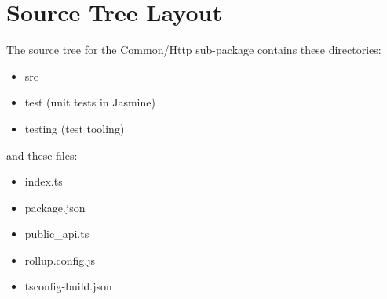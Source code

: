\section{Source Tree Layout}

The source tree for the Common/Http sub-package contains these directories:

\begin{itemize}
  \item src
  \item test (unit tests in Jasmine)
  \item testing (test tooling)
\end{itemize}

and these files:

\begin{itemize}
  \item index.ts
  \item package.json
  \item public\_api.ts
  \item rollup.config.js
  \item tsconfig-build.json
\end{itemize}


